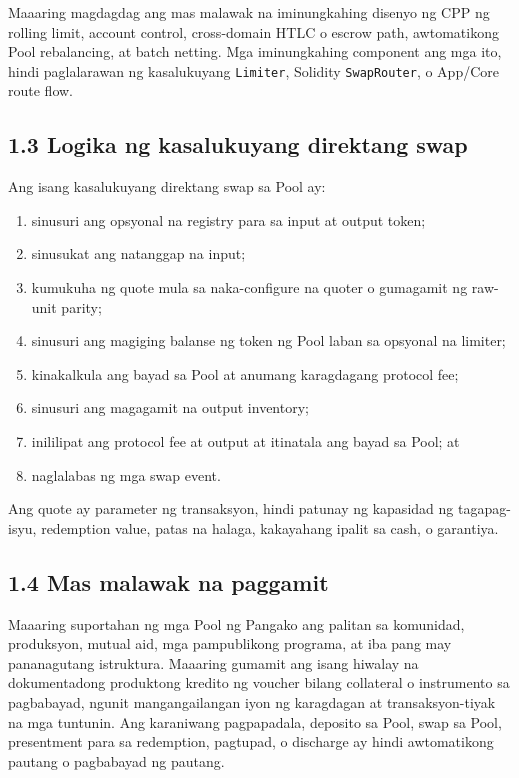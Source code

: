 \documentclass[11pt]{article}
\begin{document}
Maaaring magdagdag ang mas malawak na iminungkahing disenyo ng CPP ng rolling limit, account control, cross-domain HTLC o escrow path, awtomatikong Pool rebalancing, at batch netting. Mga iminungkahing component ang mga ito, hindi paglalarawan ng kasalukuyang \texttt{Limiter}, Solidity \texttt{SwapRouter}, o App/Core route flow.

\subsection*{1.3 Logika ng kasalukuyang direktang swap}

Ang isang kasalukuyang direktang swap sa Pool ay:

\begin{enumerate}[leftmargin=*]
\item sinusuri ang opsyonal na registry para sa input at output token;
\item sinusukat ang natanggap na input;
\item kumukuha ng quote mula sa naka-configure na quoter o gumagamit ng raw-unit parity;
\item sinusuri ang magiging balanse ng token ng Pool laban sa opsyonal na limiter;
\item kinakalkula ang bayad sa Pool at anumang karagdagang protocol fee;
\item sinusuri ang magagamit na output inventory;
\item inililipat ang protocol fee at output at itinatala ang bayad sa Pool; at
\item naglalabas ng mga swap event.
\end{enumerate}
Ang quote ay parameter ng transaksyon, hindi patunay ng kapasidad ng tagapag-isyu, redemption value, patas na halaga, kakayahang ipalit sa cash, o garantiya.

\subsection*{1.4 Mas malawak na paggamit}

Maaaring suportahan ng mga Pool ng Pangako ang palitan sa komunidad, produksyon, mutual aid, mga pampublikong programa, at iba pang may pananagutang istruktura. Maaaring gumamit ang isang hiwalay na dokumentadong produktong kredito ng voucher bilang collateral o instrumento sa pagbabayad, ngunit mangangailangan iyon ng karagdagan at transaksyon-tiyak na mga tuntunin. Ang karaniwang pagpapadala, deposito sa Pool, swap sa Pool, presentment para sa redemption, pagtupad, o discharge ay hindi awtomatikong pautang o pagbabayad ng pautang.
\end{document}
